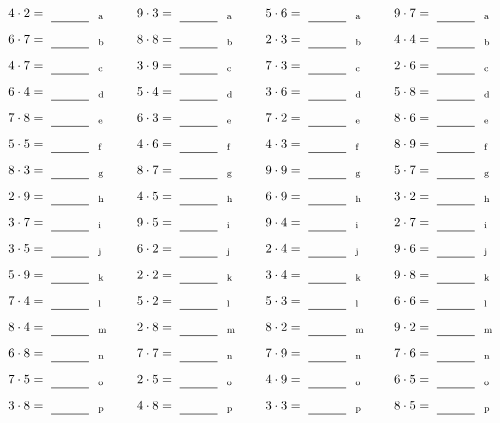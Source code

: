 \documentclass
[
  draft    = true,
  fontsize = 11pt,
  parskip  = half-
]
{scrartcl}
\begin{document}
\par\vfill\par
\begin{align*}
    \pline{4\cdot2}&=\rline{a}
  & \pline{9\cdot3}&=\rline{a}
  & \pline{5\cdot6}&=\rline{a}
  & \pline{9\cdot7}&=\rline{a} \\[1ex]
    \pline{6\cdot7}&=\rline{b}
  & \pline{8\cdot8}&=\rline{b}
  & \pline{2\cdot3}&=\rline{b}
  & \pline{4\cdot4}&=\rline{b} \\[1ex]
    \pline{4\cdot7}&=\rline{c}
  & \pline{3\cdot9}&=\rline{c}
  & \pline{7\cdot3}&=\rline{c}
  & \pline{2\cdot6}&=\rline{c} \\[1ex]
    \pline{6\cdot4}&=\rline{d}
  & \pline{5\cdot4}&=\rline{d}
  & \pline{3\cdot6}&=\rline{d}
  & \pline{5\cdot8}&=\rline{d} \\[1ex]
    \pline{7\cdot8}&=\rline{e}
  & \pline{6\cdot3}&=\rline{e}
  & \pline{7\cdot2}&=\rline{e}
  & \pline{8\cdot6}&=\rline{e} \\[1ex]
    \pline{5\cdot5}&=\rline{f}
  & \pline{4\cdot6}&=\rline{f}
  & \pline{4\cdot3}&=\rline{f}
  & \pline{8\cdot9}&=\rline{f} \\[1ex]
    \pline{8\cdot3}&=\rline{g}
  & \pline{8\cdot7}&=\rline{g}
  & \pline{9\cdot9}&=\rline{g}
  & \pline{5\cdot7}&=\rline{g} \\[1ex]
    \pline{2\cdot9}&=\rline{h}
  & \pline{4\cdot5}&=\rline{h}
  & \pline{6\cdot9}&=\rline{h}
  & \pline{3\cdot2}&=\rline{h} \\[1ex]
    \pline{3\cdot7}&=\rline{i}
  & \pline{9\cdot5}&=\rline{i}
  & \pline{9\cdot4}&=\rline{i}
  & \pline{2\cdot7}&=\rline{i} \\[1ex]
    \pline{3\cdot5}&=\rline{j}
  & \pline{6\cdot2}&=\rline{j}
  & \pline{2\cdot4}&=\rline{j}
  & \pline{9\cdot6}&=\rline{j} \\[1ex]
    \pline{5\cdot9}&=\rline{k}
  & \pline{2\cdot2}&=\rline{k}
  & \pline{3\cdot4}&=\rline{k}
  & \pline{9\cdot8}&=\rline{k} \\[1ex]
    \pline{7\cdot4}&=\rline{l}
  & \pline{5\cdot2}&=\rline{l}
  & \pline{5\cdot3}&=\rline{l}
  & \pline{6\cdot6}&=\rline{l} \\[1ex]
    \pline{8\cdot4}&=\rline{m}
  & \pline{2\cdot8}&=\rline{m}
  & \pline{8\cdot2}&=\rline{m}
  & \pline{9\cdot2}&=\rline{m} \\[1ex]
    \pline{6\cdot8}&=\rline{n}
  & \pline{7\cdot7}&=\rline{n}
  & \pline{7\cdot9}&=\rline{n}
  & \pline{7\cdot6}&=\rline{n} \\[1ex]
    \pline{7\cdot5}&=\rline{o}
  & \pline{2\cdot5}&=\rline{o}
  & \pline{4\cdot9}&=\rline{o}
  & \pline{6\cdot5}&=\rline{o} \\[1ex]
    \pline{3\cdot8}&=\rline{p}
  & \pline{4\cdot8}&=\rline{p}
  & \pline{3\cdot3}&=\rline{p}
  & \pline{8\cdot5}&=\rline{p}
\end{align*}
\end{document}
